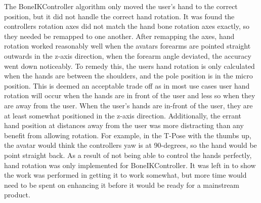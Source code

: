 \documentclass{vgtc}                          %
\begin{document}
The BoneIKController algorithm only moved the user’s hand to the correct position, but it did not handle the correct hand rotation. It was found the controllers rotation axes did not match the hand bone rotation axes exactly, so they needed be remapped to one another. After remapping the axes, hand rotation worked reasonably well when the avatars forearms are pointed straight outwards in the z-axis direction, when the forearm angle deviated, the accuracy went down noticeably. To remedy this, the users hand rotation is only calculated when the hands are between the shoulders, and the pole position is in the micro position. This is deemed an acceptable trade off as in most use cases user hand rotation will occur when the hands are in front of the user and less so when they are away from the user. When the user’s hands are in-front of the user, they are at least somewhat positioned in the z-axis direction. Additionally, the errant hand position at distances away from the user was more distracting than any benefit from allowing rotation. For example, in the T-Pose with the thumbs up, the avatar would think the controllers yaw is at 90-degrees, so the hand would be point straight back. As a result of not being able to control the hands perfectly, hand rotation was only implemented for BoneIKController. It was left in to show the work was performed in getting it to work somewhat, but more time would need to be spent on enhancing it before it would be ready for a mainstream product. 
\end{document}
